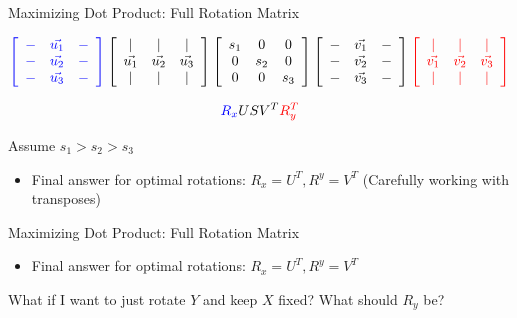 \documentclass{beamer}
\begin{document}
\begin{frame}{Maximizing Dot Product: Full Rotation Matrix}



\tiny
\[ \textcolor{blue}{\left[ \begin{array}{ccc} - & \vec{u_1} & - \\ - & \vec{u_2} & - \\ - & \vec{u_3} & - \end{array} \right]} \left[ \begin{array}{ccc} | & | & | \\ \vec{u_1} & \vec{u_2} & \vec{u_3} \\ | & | & | \end{array} \right]  \left[ \begin{array}{ccc} s_1 & 0 & 0 \\ 0 & s_2 & 0 \\ 0 & 0 & s_3 \end{array} \right] \left[ \begin{array}{ccc} - & \vec{v_1} & - \\ - & \vec{v_2} & - \\ - & \vec{v_3} & - \end{array} \right] \textcolor{red}{\left[ \begin{array}{ccc} | & | & | \\ \vec{v_1} & \vec{v_2} & \vec{v_3} \\ | & | & | \end{array} \right]} \]

\small

\[ \textcolor{blue}{R_x} U S V^T \textcolor{red}{R_y^T} \]

Assume $s_1 > s_2 > s_3$

\begin{itemize}[label=$\blacktriangleright$]
\item Final answer for optimal rotations: $ R_x = U^T, R^y = V^T$
(Carefully working with transposes)
\end{itemize}

\end{frame}

\begin{frame}{Maximizing Dot Product: Full Rotation Matrix}

\begin{itemize}[label=$\blacktriangleright$]
\item Final answer for optimal rotations: $ R_x = U^T, R^y = V^T$
\end{itemize}

What if I want to just rotate $Y$ and keep $X$ fixed?  What should $R_y$ be?


\end{frame}
\end{document}
